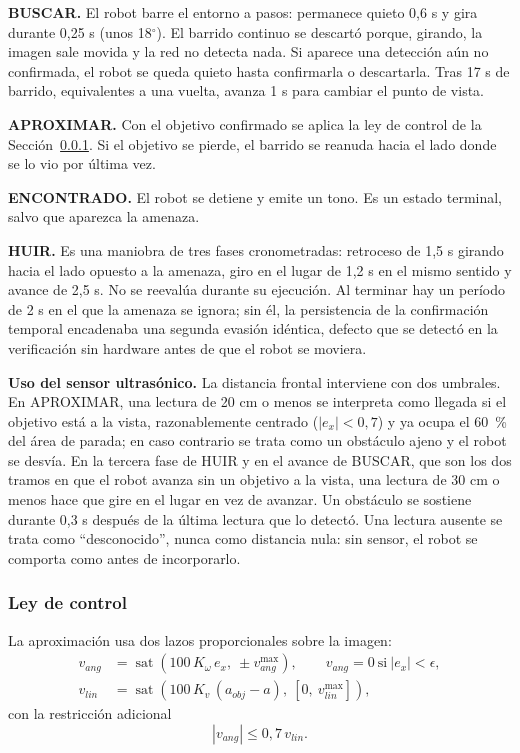 \documentclass[pdflatex,sn-mathphys-num]{sn-jnl}
\newcommand{\grad}{\ensuremath{^\circ}}
\begin{document}
\textbf{BUSCAR.} El robot barre el entorno a pasos: permanece quieto 0,6 s y
gira durante 0,25 s (unos 18\grad). El barrido continuo se descart\'o porque,
girando, la imagen sale movida y la red no detecta nada. Si aparece una
detecci\'on a\'un no confirmada, el robot se queda quieto hasta confirmarla o
descartarla. Tras 17 s de barrido, equivalentes a una vuelta, avanza 1 s para
cambiar el punto de vista.

\textbf{APROXIMAR.} Con el objetivo confirmado se aplica la ley de control de
la Secci\'on~\ref{subsubsec:ley}. Si el objetivo se pierde, el barrido se
reanuda hacia el lado donde se lo vio por \'ultima vez.

\textbf{ENCONTRADO.} El robot se detiene y emite un tono. Es un estado
terminal, salvo que aparezca la amenaza.

\textbf{HUIR.} Es una maniobra de tres fases cronometradas: retroceso de
1,5 s girando hacia el lado opuesto a la amenaza, giro en el lugar de 1,2 s en
el mismo sentido y avance de 2,5 s. No se reeval\'ua durante su ejecuci\'on.
Al terminar hay un per\'iodo de 2 s en el que la amenaza se ignora; sin \'el,
la persistencia de la confirmaci\'on temporal encadenaba una segunda evasi\'on
id\'entica, defecto que se detect\'o en la verificaci\'on sin hardware antes
de que el robot se moviera.

\textbf{Uso del sensor ultras\'onico.} La distancia frontal interviene con
dos umbrales. En APROXIMAR, una lectura de 20 cm o menos se interpreta como
llegada si el objetivo est\'a a la vista, razonablemente centrado
($|e_x|<0{,}7$) y ya ocupa el 60~\% del \'area de parada; en caso contrario se
trata como un obst\'aculo ajeno y el robot se desv\'ia. En la tercera fase de
HUIR y en el avance de BUSCAR, que son los dos tramos en que el robot avanza
sin un objetivo a la vista, una lectura de 30 cm o menos hace que gire en el
lugar en vez de avanzar. Un obst\'aculo se sostiene durante 0,3 s despu\'es de
la \'ultima lectura que lo detect\'o. Una lectura ausente se trata como
``desconocido'', nunca como distancia nula: sin sensor, el robot se comporta
como antes de incorporarlo.

\subsubsection{Ley de control}\label{subsubsec:ley}

La aproximaci\'on usa dos lazos proporcionales sobre la imagen:
\begin{align}
  v_{ang} &= \operatorname{sat}\!\left(100\,K_{\omega}\,e_x,\ \pm v_{ang}^{\max}\right),
            \qquad v_{ang}=0 \ \text{si}\ |e_x|<\epsilon, \label{eq:giro}\\
  v_{lin} &= \operatorname{sat}\!\left(100\,K_{v}\,(a_{obj}-a),\ [0,\ v_{lin}^{\max}]\right), \label{eq:avance}
\end{align}
con la restricci\'on adicional
\begin{equation}
  |v_{ang}| \le 0{,}7\,v_{lin}. \label{eq:recorte}
\end{equation}
\end{document}
